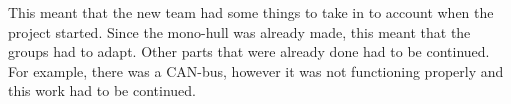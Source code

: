 
This meant that the new team had some things to take in to account when the project started. Since the mono-hull was already made, this meant that the groups had to adapt. Other parts that were already done had to be continued. For example, there was a CAN-bus, however it was not functioning properly and this work had to be continued. 

 